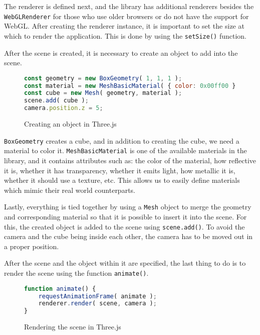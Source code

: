 The renderer is defined next, and the library has additional renderers besides the \texttt{WebGLRenderer} for those who use older browsers or do not
have the support for WebGL. After creating the renderer instance, it is important to set the size at which to render the application. This is done by
using the \texttt{setSize()} function.

\clearpage

After the scene is created, it is necessary to create an object to add into the scene.

\begin{figure}[hbt!]
    \begin{center}
        \begin{lstlisting}[language=JavaScript,label={lst:threejs-code-2},belowskip=-1 \baselineskip]
const geometry = new BoxGeometry( 1, 1, 1 );
const material = new MeshBasicMaterial( { color: 0x00ff00 } );
const cube = new Mesh( geometry, material );
scene.add( cube );
camera.position.z = 5;
        \end{lstlisting}
    \end{center}
    \caption{Creating an object in Three.js}
    \label{fig:figure4.4}
\end{figure}

\texttt{BoxGeometry} creates a cube, and in addition to creating the cube, we need a material to color it. \texttt{MeshBasicMaterial} is one
of the available materials in the library, and it contains attributes such as: the color of the material, how reflective it is, whether it has
transparency, whether it emits light, how metallic it is, whether it should use a texture, etc. This allows us to easily define materials which mimic
their real world counterparts.

Lastly, everything is tied together by using a \texttt{Mesh} object to merge the geometry and corresponding material so
that it is possible to insert it into the scene. For this, the created object is added to the scene using \texttt{scene.add()}. To avoid the camera
and the cube being inside each other, the camera has to be moved out in a proper position.

After the scene and the object within it are specified, the last thing to do is to render the scene using the function \texttt{animate()}.

\begin{figure}[hbt!]
    \begin{center}
        \begin{lstlisting}[language=JavaScript,label={lst:threejs-code-3},belowskip=-1 \baselineskip]
function animate() {
    requestAnimationFrame( animate );
    renderer.render( scene, camera );
}
        \end{lstlisting}
    \end{center}
    \caption{Rendering the scene in Three.js}
    \label{fig:figure4.5}
\end{figure}

\clearpage
